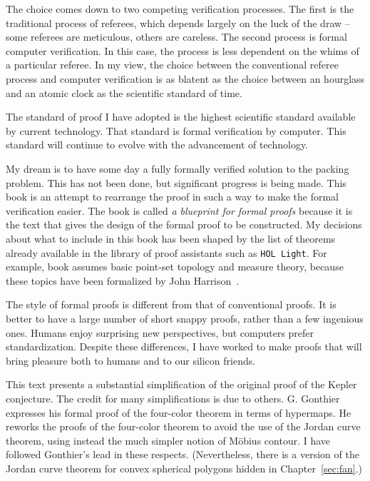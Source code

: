The choice comes down to two competing verification processes.  The
first is the traditional process of referees, which depends largely on
the luck of the draw -- some referees are meticulous, others are
careless.  The second process is formal computer verification. In this
case, the process is less dependent on the whims of a particular
referee.  In my view, the choice between the conventional referee
process and computer verification is as blatent as the choice between
an hourglass and an atomic clock as the scientific standard of time.

The standard of proof I have adopted is the highest scientific standard
available by current technology.  That 
standard is formal verification by computer.  This standard will
continue to evolve with the advancement of technology.

My dream is to have some day a fully formally verified solution to the
packing problem.  This has not been done, but significant progress is
being made.  This book is an attempt to rearrange the proof in such a
way to make the formal verification easier.  The book is called {\it a
  blueprint for formal proofs} because it is the text that gives the
design of the formal proof to be constructed.  My decisions about what
to include in this book has been shaped by the list of theorems
already available in the library of proof assistants such as {\tt HOL
  Light}.  For example, book assumes basic point-set topology and
measure theory, because these topics have been formalized by John
Harrison~\cite{unknown}.

The style of formal proofs is different from that of
conventional proofs.  It is better to have a large number of short
snappy proofs, rather than a few ingenious ones.  Humans enjoy
surprising new perspectives, but computers prefer standardization.
Despite these differences, I have worked to make proofs that
will bring pleasure both to humans and to our silicon friends.

This text presents a substantial simplification of the original proof
of the Kepler conjecture.  The credit for many simplifications is due
to others.  G. Gonthier expresses his formal proof of the four-color
theorem in terms of hypermaps.  He reworks the proofs of the
four-color theorem to avoid the use of the Jordan curve theorem, using
instead the much simpler notion of M\"obius contour.  I have followed
Gonthier's lead in these respects.  (Nevertheless, there is a version
of the Jordan curve theorem for convex spherical polygons hidden in
Chapter~\ref{sec:fan}.)

